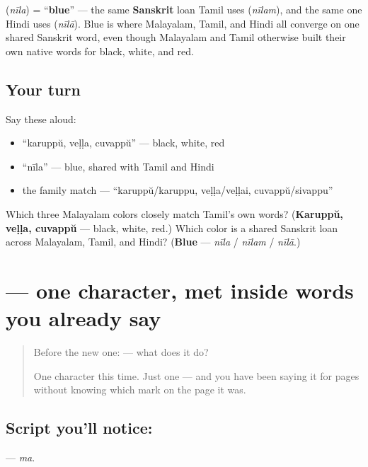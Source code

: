 \begin{cousinweb}
\textbf{} (\emph{nīla}) = \textquotedblleft{}\textbf{blue}\textquotedblright{} — the same \textbf{Sanskrit} loan Tamil uses (\emph{nīlam}), and the same one Hindi uses (\emph{nīlā}). Blue is where Malayalam, Tamil, and Hindi all converge on one shared Sanskrit word, even though Malayalam and Tamil otherwise built their own native words for black, white, and red.
\end{cousinweb}

\subsection*{Your turn}
Say these aloud:

\begin{itemize}
\raggedright
  \item \textquotedblleft{}karuppŭ, veḷḷa, cuvappŭ\textquotedblright{} — black, white, red
  \item \textquotedblleft{}nīla\textquotedblright{} — blue, shared with Tamil and Hindi
  \item the family match — \textquotedblleft{}karuppŭ/karuppu, veḷḷa/veḷḷai, cuvappŭ/sivappu\textquotedblright{}
\end{itemize}

\begin{tcolorbox}[breakable,colback=teal!4,colframe=teal!35!black,title={Before you move on}]
Which three Malayalam colors closely match Tamil's own words? (\textbf{Karuppŭ, veḷḷa, cuvappŭ} — black, white, red.) Which color is a shared Sanskrit loan across Malayalam, Tamil, and Hindi? (\textbf{Blue} —  \emph{nīla} /  \emph{nīlam} /  \emph{nīlā}.)
\end{tcolorbox}
\section[\texorpdfstring{\ml{മ} (ma)}{മ (ma)}]{ — one character, met inside words you already say}

\label{lesson:ML-S114-letter-ma}



\begin{quote}
Before the new one:  — what does it do?

One character this time. Just one — and you have been saying it for pages without knowing which mark on the page it was.
\end{quote}

\subsection*{Script you'll notice: }
\textbf{} — \emph{ma}.

